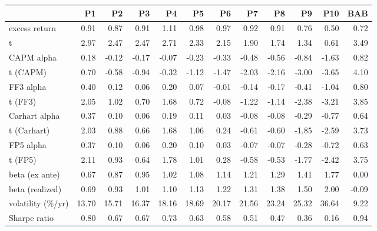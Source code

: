 \begin{tabular}{lrrrrrrrrrrr}
\toprule
 & P1 & P2 & P3 & P4 & P5 & P6 & P7 & P8 & P9 & P10 & BAB \\
\midrule
excess return & 0.91 & 0.87 & 0.91 & 1.11 & 0.98 & 0.97 & 0.92 & 0.91 & 0.76 & 0.50 & 0.72 \\
  t & 2.97 & 2.47 & 2.47 & 2.71 & 2.33 & 2.15 & 1.90 & 1.74 & 1.34 & 0.61 & 3.49 \\
CAPM alpha & 0.18 & -0.12 & -0.17 & -0.07 & -0.23 & -0.33 & -0.48 & -0.56 & -0.84 & -1.63 & 0.82 \\
  t (CAPM) & 0.70 & -0.58 & -0.94 & -0.32 & -1.12 & -1.47 & -2.03 & -2.16 & -3.00 & -3.65 & 4.10 \\
FF3 alpha & 0.40 & 0.12 & 0.06 & 0.20 & 0.07 & -0.01 & -0.14 & -0.17 & -0.41 & -1.04 & 0.80 \\
  t (FF3) & 2.05 & 1.02 & 0.70 & 1.68 & 0.72 & -0.08 & -1.22 & -1.14 & -2.38 & -3.21 & 3.85 \\
Carhart alpha & 0.37 & 0.10 & 0.06 & 0.19 & 0.11 & 0.03 & -0.08 & -0.08 & -0.29 & -0.77 & 0.64 \\
  t (Carhart) & 2.03 & 0.88 & 0.66 & 1.68 & 1.06 & 0.24 & -0.61 & -0.60 & -1.85 & -2.59 & 3.73 \\
FP5 alpha & 0.37 & 0.10 & 0.06 & 0.20 & 0.10 & 0.03 & -0.07 & -0.07 & -0.28 & -0.72 & 0.63 \\
  t (FP5) & 2.11 & 0.93 & 0.64 & 1.78 & 1.01 & 0.28 & -0.58 & -0.53 & -1.77 & -2.42 & 3.75 \\
beta (ex ante) & 0.67 & 0.87 & 0.95 & 1.02 & 1.08 & 1.14 & 1.21 & 1.29 & 1.41 & 1.77 & 0.00 \\
beta (realized) & 0.69 & 0.93 & 1.01 & 1.10 & 1.13 & 1.22 & 1.31 & 1.38 & 1.50 & 2.00 & -0.09 \\
volatility (\%/yr) & 13.70 & 15.71 & 16.37 & 18.16 & 18.69 & 20.17 & 21.56 & 23.24 & 25.32 & 36.64 & 9.22 \\
Sharpe ratio & 0.80 & 0.67 & 0.67 & 0.73 & 0.63 & 0.58 & 0.51 & 0.47 & 0.36 & 0.16 & 0.94 \\
\bottomrule
\end{tabular}
